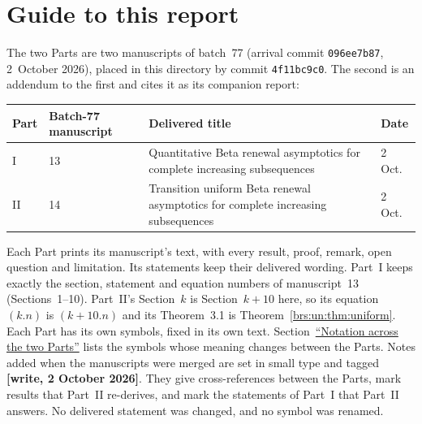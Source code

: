 \documentclass[11pt]{article}
\numberwithin{equation}{section}
\theoremstyle{remark}\newtheorem{remark}[theorem]{Remark}
\begin{document}
\section*{Guide to this report}\label{brs:sec:guide}
The two Parts are two manuscripts of batch~77 (arrival commit \texttt{096ee7b87}, 2~October 2026), placed in this directory by commit \texttt{4f11bc9c0}. The second is an addendum to the first and cites it as its companion report:
\begin{center}
\begin{tabular}{@{}l l >{\raggedright\arraybackslash}p{} l@{}}
\toprule
Part & Batch-77 manuscript & Delivered title & Date\\
\midrule
I & 13 & Quantitative Beta renewal asymptotics for complete increasing subsequences & 2 Oct.\\
II & 14 & Transition uniform Beta renewal asymptotics for complete increasing subsequences & 2 Oct.\\
\bottomrule
\end{tabular}
\end{center}
Each Part prints its manuscript's text, with every result, proof, remark, open question and limitation. Its statements keep their delivered wording. Part~I keeps exactly the section, statement and equation numbers of manuscript~13 (Sections~1--10). Part~II's Section~$k$ is Section~$k+10$ here, so its equation $(k.n)$ is $(k+10.n)$ and its Theorem~3.1 is Theorem~\ref{brs:un:thm:uniform}. Each Part has its own symbols, fixed in its own text. Section~\hyperref[brs:sec:notation]{``Notation across the two Parts''} lists the symbols whose meaning changes between the Parts. Notes added when the manuscripts were merged are set in small type and tagged \textbf{[write, 2 October 2026]}. They give cross-references between the Parts, mark results that Part~II re-derives, and mark the statements of Part~I that Part~II answers. No delivered statement was changed, and no symbol was renamed.
\end{document}
